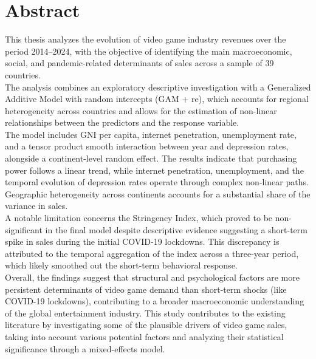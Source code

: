 \chapter*{Abstract}

This thesis analyzes the evolution of video game industry 
revenues over the period 2014–2024, with the objective of 
identifying the main macroeconomic, social, and pandemic-related
determinants of sales across a sample of 39 countries.\\
The analysis combines an exploratory descriptive investigation 
with a Generalized Additive Model with random intercepts (GAM + re), which accounts 
for regional heterogeneity across countries and allows for the 
estimation of non-linear relationships between the predictors 
and the response variable.\\
The model includes GNI per capita, internet penetration, 
unemployment rate, and a tensor product smooth interaction 
between year and depression rates, alongside a continent-level 
random effect. The results indicate that purchasing power follows 
a linear trend, while internet penetration, unemployment, and the 
temporal evolution of depression rates operate through complex 
non-linear paths. Geographic heterogeneity across continents 
accounts for a substantial share of the variance in sales.\\
A notable limitation concerns the Stringency Index, which proved to be
non-significant in the final model despite descriptive evidence 
suggesting a short-term spike in sales during the initial COVID-19 
lockdowns. This discrepancy is attributed to the temporal 
aggregation of the index across a three-year period, which likely 
smoothed out the short-term behavioral response.\\
Overall, the findings suggest that structural and psychological 
factors are more persistent determinants of video game demand than 
short-term shocks (like COVID-19 lockdowns), contributing to a broader macroeconomic 
understanding of the global entertainment industry.
This study contributes to the existing literature by investigating
some of the plausible drivers of video game sales,
taking into account various potential factors and analyzing
their statistical significance through a mixed-effects model.
